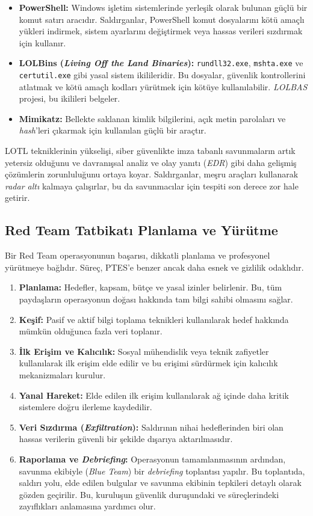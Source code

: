 \begin{itemize}
\item \textbf{PowerShell:} Windows işletim sistemlerinde yerleşik olarak bulunan güçlü bir komut satırı aracıdır. Saldırganlar, PowerShell komut dosyalarını kötü amaçlı yükleri indirmek, sistem ayarlarını değiştirmek veya hassas verileri sızdırmak için kullanır.
\item \textbf{LOLBins (\textit{Living Off the Land Binaries}):} \texttt{rundll32.exe}, \texttt{mshta.exe} ve \texttt{certutil.exe} gibi yasal sistem ikilileridir. Bu dosyalar, güvenlik kontrollerini atlatmak ve kötü amaçlı kodları yürütmek için kötüye kullanılabilir. \textit{LOLBAS} projesi, bu ikilileri belgeler.
\item \textbf{Mimikatz:} Bellekte saklanan kimlik bilgilerini, açık metin parolaları ve \textit{hash}'leri çıkarmak için kullanılan güçlü bir araçtır.
\end{itemize}

LOTL tekniklerinin yükselişi, siber güvenlikte imza tabanlı savunmaların artık yetersiz olduğunu ve davranışsal analiz ve olay yanıtı (\textit{EDR}) gibi daha gelişmiş çözümlerin zorunluluğunu ortaya koyar. Saldırganlar, meşru araçları kullanarak \textit{radar altı} kalmaya çalışırlar, bu da savunmacılar için tespiti son derece zor hale getirir.

\subsection{Red Team Tatbikatı Planlama ve Yürütme}

Bir Red Team operasyonunun başarısı, dikkatli planlama ve profesyonel yürütmeye bağlıdır. Süreç, PTES'e benzer ancak daha esnek ve gizlilik odaklıdır.

\begin{enumerate}
\item \textbf{Planlama:} Hedefler, kapsam, bütçe ve yasal izinler belirlenir. Bu, tüm paydaşların operasyonun doğası hakkında tam bilgi sahibi olmasını sağlar.
\item \textbf{Keşif:} Pasif ve aktif bilgi toplama teknikleri kullanılarak hedef hakkında mümkün olduğunca fazla veri toplanır.
\item \textbf{İlk Erişim ve Kalıcılık:} Sosyal mühendislik veya teknik zafiyetler kullanılarak ilk erişim elde edilir ve bu erişimi sürdürmek için kalıcılık mekanizmaları kurulur.
\item \textbf{Yanal Hareket:} Elde edilen ilk erişim kullanılarak ağ içinde daha kritik sistemlere doğru ilerleme kaydedilir.
\item \textbf{Veri Sızdırma (\textit{Exfiltration}):} Saldırının nihai hedeflerinden biri olan hassas verilerin güvenli bir şekilde dışarıya aktarılmasıdır.
\item \textbf{Raporlama ve \textit{Debriefing}:} Operasyonun tamamlanmasının ardından, savunma ekibiyle (\textit{Blue Team}) bir \textit{debriefing} toplantısı yapılır. Bu toplantıda, saldırı yolu, elde edilen bulgular ve savunma ekibinin tepkileri detaylı olarak gözden geçirilir. Bu, kuruluşun güvenlik duruşundaki ve süreçlerindeki zayıflıkları anlamasına yardımcı olur.
\end{enumerate}


